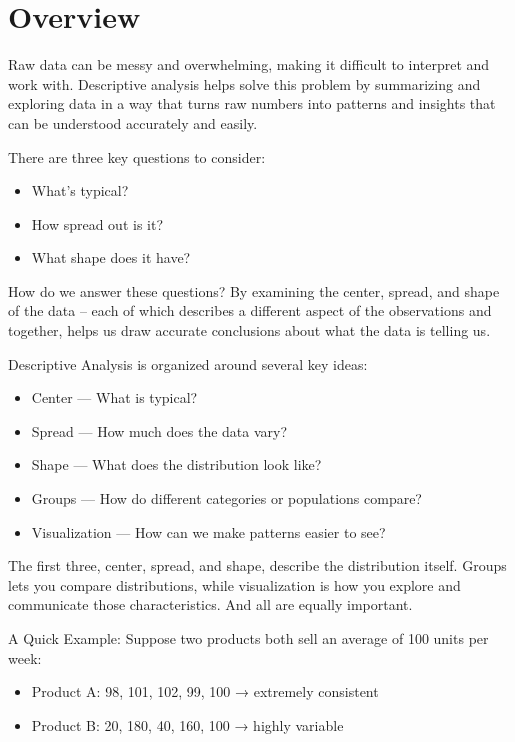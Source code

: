 \documentclass[
  letterpaper,
  DIV=11,
  numbers=noendperiod]{scrreprt}
\providecommand{\tightlist}{%
  \setlength{\itemsep}{0pt}\setlength{\parskip}{0pt}}
\begin{document}
\section{Overview}\label{overview-1}

Raw data can be messy and overwhelming, making it difficult to interpret
and work with. Descriptive analysis helps solve this problem by
summarizing and exploring data in a way that turns raw numbers into
patterns and insights that can be understood accurately and easily.

There are three key questions to consider:

\begin{itemize}
\tightlist
\item
  What's typical?
\item
  How spread out is it?
\item
  What shape does it have?
\end{itemize}

How do we answer these questions? By examining the center, spread, and
shape of the data -- each of which describes a different aspect of the
observations and together, helps us draw accurate conclusions about what
the data is telling us.

Descriptive Analysis is organized around several key ideas:

\begin{itemize}
\tightlist
\item
  Center --- What is typical?
\item
  Spread --- How much does the data vary?
\item
  Shape --- What does the distribution look like?
\item
  Groups --- How do different categories or populations compare?
\item
  Visualization --- How can we make patterns easier to see?
\end{itemize}

The first three, center, spread, and shape, describe the distribution
itself. Groups lets you compare distributions, while visualization is
how you explore and communicate those characteristics. And all are
equally important.

A Quick Example: Suppose two products both sell an average of 100 units
per week:

\begin{itemize}
\tightlist
\item
  Product A: 98, 101, 102, 99, 100 → extremely consistent
\item
  Product B: 20, 180, 40, 160, 100 → highly variable
\end{itemize}
\end{document}

